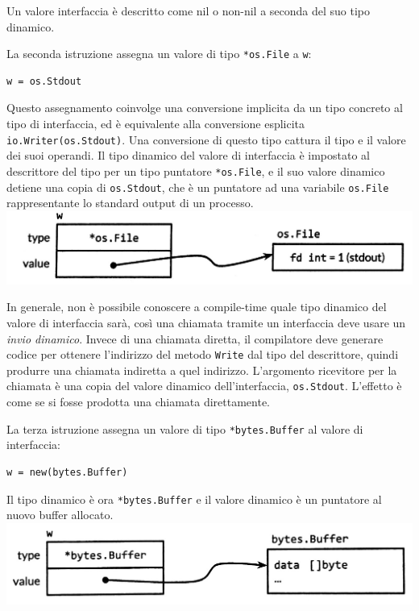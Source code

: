 \documentclass[../../thesis.tex]{subfiles}
\begin{document}
    \justifying\noindent Un valore interfaccia è descritto come nil o non-nil a seconda del suo tipo dinamico.
    \hfill \vspace{12pt}

    La seconda istruzione assegna un valore di tipo \verb"*os.File" a \verb"w":
    \begin{lstlisting}[frame = single,label={lst:lstlisting6-5.3}]
w = os.Stdout
    \end{lstlisting}
    Questo assegnamento coinvolge una conversione implicita da un tipo concreto al tipo di interfaccia, ed è equivalente alla conversione esplicita \verb"io.Writer(os.Stdout)".
    Una conversione di questo tipo cattura il tipo e il valore dei suoi operandi.
    Il tipo dinamico del valore di interfaccia è impostato al descrittore del tipo per un tipo puntatore \verb"*os.File", e il suo valore dinamico detiene una copia di \verb"os.Stdout", che è un puntatore ad una variabile \verb"os.File" rappresentante lo standard output di un processo.
    \center\includegraphics[scale = 0.25]{figura-7.2}

    \justifying\noindent In generale, non è possibile conoscere a compile-time quale tipo dinamico del valore di interfaccia sarà, così una chiamata tramite un interfaccia deve usare un \textit{invio dinamico}.
    Invece di una chiamata diretta, il compilatore deve generare codice per ottenere l'indirizzo del metodo \verb"Write" dal tipo del descrittore, quindi produrre una chiamata indiretta a quel indirizzo.
    L'argomento ricevitore per la chiamata è una copia del valore dinamico dell'interfaccia, \verb"os.Stdout".
    L'effetto è come se si fosse prodotta una chiamata direttamente.
    \hfill \vspace{12pt}

    La terza istruzione assegna un valore di tipo \verb"*bytes.Buffer" al valore di interfaccia:
    \begin{lstlisting}[frame = single,label={lst:lstlisting6-5.4}]
w = new(bytes.Buffer)
    \end{lstlisting}
    Il tipo dinamico è ora \verb"*bytes.Buffer" e il valore dinamico è un puntatore al nuovo buffer allocato.
    \center\includegraphics[scale = 0.25]{figura-7.3}
\end{document}
